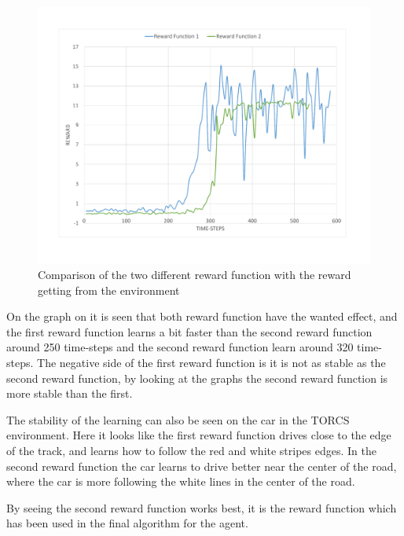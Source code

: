 \begin{figure}[H]
	\centering
	\includegraphics[width=1\textwidth]{Figures/Result/change_of_Reward_reward_graph.pdf}
	\caption{Comparison of the two different reward function with the reward getting from the environment}
	\label{fig:change_of_Reward_reward_graph}
\end{figure}

On the graph on  it is seen that both reward function have the wanted effect, and the first reward function learns a bit faster than the second reward function around 250 time-steps and the second reward function learn around 320 time-steps. The negative side of the first reward function is it is not as stable as the second reward function, by looking at the graphs the second reward function is more stable than the first. 

The stability of the learning can also be seen on the car in the TORCS environment. Here it looks like the first reward function drives close to the edge of the track, and learns how to follow the red and white stripes edges. In the second reward function the car learns to drive better near the center of the road, where the car is more following the white lines in the center of the road. 

By seeing the second reward function works best, it is the reward function which has been used in the final algorithm for the agent.  
